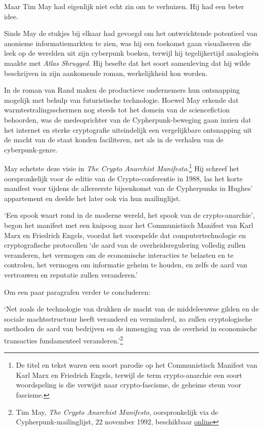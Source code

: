 \documentclass[
  a5paper,
  smalldemyvopaper,11pt,twoside,onecolumn,openright,extrafontsizes,
hidelinks]{memoir}
\begin{document}
Maar Tim May had eigenlijk niet echt zin om te verhuizen. Hij had een
beter idee.

Sinds May de stukjes bij elkaar had gevoegd om het ontwrichtende
potentieel van anonieme informatiemarkten te zien, was hij een toekomst
gaan visualiseren die leek op de werelden uit zijn cyberpunk boeken,
terwijl hij tegelijkertijd analogieën maakte met \emph{Atlas Shrugged}.
Hij besefte dat het soort samenleving dat hij wilde beschrijven in zijn
aankomende roman, werkelijkheid kon worden.

In de roman van Rand maken de productieve ondernemers hun ontsnapping
mogelijk met behulp van futuristische technologie. Hoewel May erkende
dat warmtestralingsschermen nog steeds tot het domein van de
sciencefiction behoorden, was de medeoprichter van de
Cypherpunk-beweging gaan inzien dat het internet en sterke cryptografie
uiteindelijk een vergelijkbare ontsnapping uit de macht van de staat
konden faciliteren, net als in de verhalen van de cyberpunk-genre.

May schetste deze visie in \emph{The Crypto Anarchist
Manifesto}.\footnote{De titel en tekst waren een soort parodie op het
  Communistisch Manifest van Karl Marx en Friedrich Engels, terwijl de
  term crypto-anarchie een soort woordspeling is die verwijst naar
  crypto-fascisme, de geheime steun voor fascisme.} Hij schreef het
oorspronkelijk voor de editie van de Crypto-conferentie in 1988, las het
korte manifest voor tijdens de allereerste bijeenkomst van de
Cypherpunks in Hughes' appartement en deelde het later ook via hun
mailinglijst.

`Een spook waart rond in de moderne wereld, het spook van de
crypto-anarchie', begon het manifest met een knipoog naar het
Communistisch Manifest van Karl Marx en Friedrich Engels, voordat het
voorspelde dat computertechnologie en cryptografische protocollen `de
aard van de overheidsregulering volledig zullen veranderen, het vermogen
om de economische interacties te belasten en te controlen, het vermogen
om informatie geheim te houden, en zelfs de aard van vertrouwen en
reputatie zullen veranderen.'

Om een paar paragrafen verder te concluderen:

`Net zoals de technologie van drukken de macht van de middeleeuwse
gilden en de sociale machtsstructuur heeft veranderd en verminderd, zo
zullen cryptologische methoden de aard van bedrijven en de inmenging van
de overheid in economische transacties fundamenteel
veranderen.'\footnote{Tim May, \emph{The Crypto Anarchist Manifesto},
  oorspronkelijk via de Cypherpunk-mailinglijst, 22 november 1992,
  beschikbaar
  \href{https://cypherpunks.venona.com/date/1992/11/msg00204.html}{online}}
\end{document}

